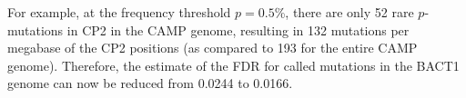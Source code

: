 For example, at the frequency threshold $p=0.5$\%, there are only 52 rare $p$-mutations in CP2 in the CAMP genome, resulting in 132 mutations per megabase of the CP2 positions (as compared to 193 for the entire CAMP genome). Therefore, the estimate of the FDR for called mutations in the BACT1 genome can now be reduced from 0.0244 to 0.0166.\endinput